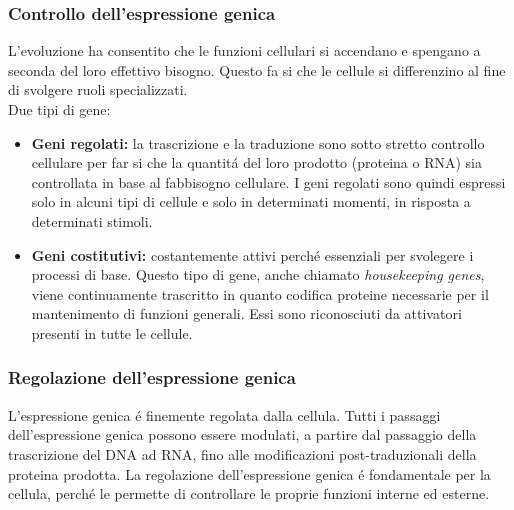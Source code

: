 \documentclass[hyperref={pdfpagelabels=false}]{beamer}
\begin{document}
\begin{frame}\frametitle{Controllo dell'espressione genica}
L'evoluzione ha consentito che le funzioni cellulari si accendano e spengano a seconda del loro effettivo bisogno. Questo fa si che le cellule si differenzino al fine di svolgere ruoli specializzati.
\\
Due tipi di gene:
\begin{itemize}
\item \textbf{Geni regolati:} la trascrizione e la traduzione sono sotto stretto controllo cellulare per far si che la quantit\'a del loro prodotto (proteina o RNA) sia controllata in base al fabbisogno cellulare. I geni regolati sono quindi espressi solo in alcuni tipi di cellule e solo in determinati momenti, in risposta a determinati stimoli.
\item \textbf{Geni costitutivi:} costantemente attivi perch\'e essenziali per svolegere i processi di base. Questo tipo di gene, anche chiamato \emph{housekeeping genes}, viene continuamente trascritto in quanto codifica proteine necessarie per il mantenimento di funzioni generali. Essi sono riconosciuti da attivatori  presenti in tutte le 
cellule.
\end{itemize}
\end{frame}


\begin{frame}\frametitle{Regolazione dell'espressione genica}
L'espressione genica \'e finemente regolata dalla cellula. Tutti i passaggi dell'espressione genica possono essere modulati, a partire dal passaggio della trascrizione del DNA ad RNA, fino alle modificazioni post-traduzionali della proteina prodotta. La regolazione dell'espressione genica \'e fondamentale per la cellula, perch\'e le permette di controllare le proprie funzioni interne ed esterne.
\end{frame}
\end{document}
